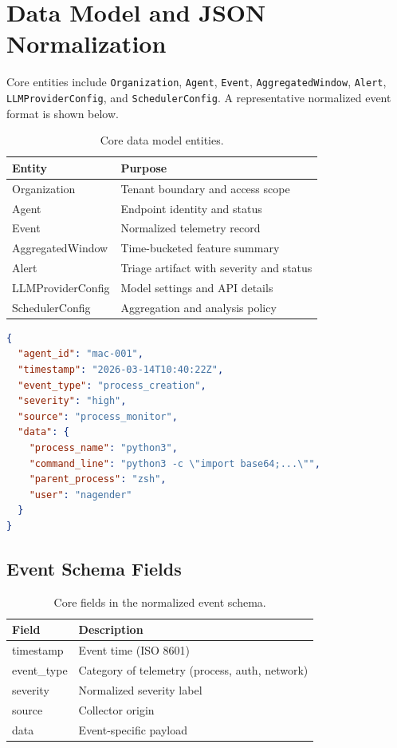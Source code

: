 \documentclass[conference]{IEEEtran}
\begin{document}
\section{Data Model and JSON Normalization}
Core entities include \texttt{Organization}, \texttt{Agent}, \texttt{Event}, \texttt{AggregatedWindow}, \texttt{Alert}, \texttt{LLMProviderConfig}, and \texttt{SchedulerConfig}.  
A representative normalized event format is shown below.

\begin{table}[!t]
\centering
\begin{tabular}{ll}
\toprule
\textbf{Entity} & \textbf{Purpose} \\
\midrule
Organization & Tenant boundary and access scope \\
Agent & Endpoint identity and status \\
Event & Normalized telemetry record \\
AggregatedWindow & Time-bucketed feature summary \\
Alert & Triage artifact with severity and status \\
LLMProviderConfig & Model settings and API details \\
SchedulerConfig & Aggregation and analysis policy \\
\bottomrule
\end{tabular}
\caption{Core data model entities.}
\label{tab:entities}
\end{table}

\begin{lstlisting}[language=json,caption={Normalized endpoint event schema}]
{
  "agent_id": "mac-001",
  "timestamp": "2026-03-14T10:40:22Z",
  "event_type": "process_creation",
  "severity": "high",
  "source": "process_monitor",
  "data": {
    "process_name": "python3",
    "command_line": "python3 -c \"import base64;...\"",
    "parent_process": "zsh",
    "user": "nagender"
  }
}
\end{lstlisting}

\subsection{Event Schema Fields}
\begin{table}[!t]
\centering
\begin{tabular}{>{\raggedright\arraybackslash}p{} >{\raggedright\arraybackslash}p{}}
\toprule
\textbf{Field} & \textbf{Description} \\
\midrule
timestamp & Event time (ISO 8601) \\
event\_type & Category of telemetry (process, auth, network) \\
severity & Normalized severity label \\
source & Collector origin \\
data & Event-specific payload \\
\bottomrule
\end{tabular}
\caption{Core fields in the normalized event schema.}
\label{tab:event-fields}
\end{table}
\end{document}
